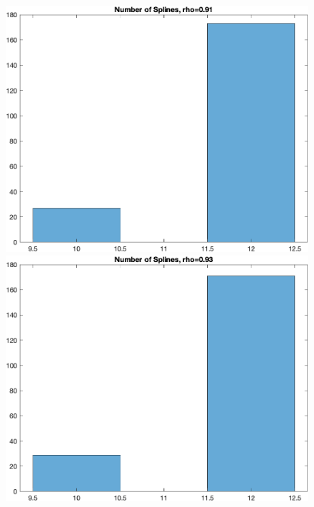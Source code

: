 \documentclass[
]{article}
\begin{document}
\begin{figure}

\begin{minipage}{0.50\linewidth}
\includegraphics{../figures/hist_n_spli_rho-0.91_finer_grid.png}\end{minipage}%
%
\begin{minipage}{0.50\linewidth}
\includegraphics{../figures/hist_n_spli_rho-0.93_finer_grid.png}\end{minipage}%
\newline
\begin{minipage}{0.50\linewidth}

\end{minipage}
\end{figure}
\end{document}
